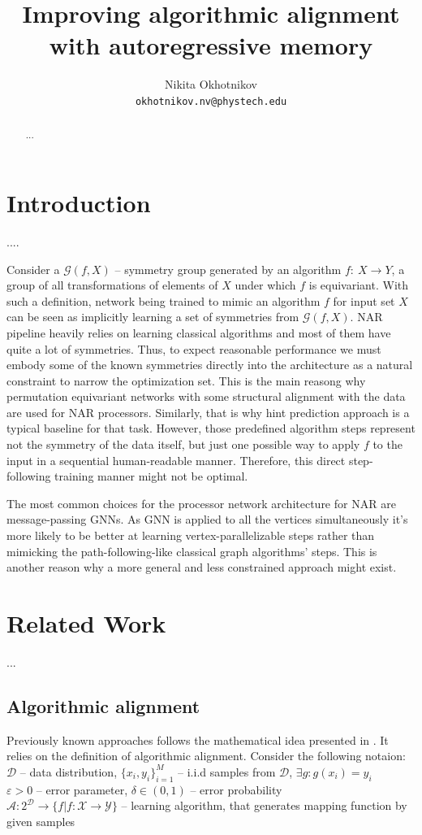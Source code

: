 \documentclass{article}
\title{Improving algorithmic alignment with autoregressive memory}
\author{Nikita Okhotnikov\\
	\texttt{okhotnikov.nv@phystech.edu} \\
}
\date{}
\begin{document}
\maketitle
\begin{abstract}
    ...
\end{abstract}

\section{Introduction}
    ....

     Consider a $\mathcal{G}(f, X)$ -- symmetry group generated
    by an algorithm $f:~ X\to Y$, a group of all transformations of elements of $X$ under which $f$ is equivariant. With such a definition, network being trained to 
    mimic an algorithm $f$ for input set $X$ can be seen as implicitly learning a set of symmetries from $\mathcal{G}(f, X)$. NAR \cite{velivckovic2021neural} 
    pipeline heavily relies on learning classical algorithms and most of them have quite a lot of symmetries. Thus, to expect reasonable performance we must embody 
    some of the known symmetries directly into the architecture as a natural constraint to narrow the optimization set. This is the main reasong why 
    permutation equivariant networks with some structural alignment with the data are used for NAR processors. 
    Similarly, that is why hint prediction approach is a typical baseline for that task. However, those predefined algorithm steps represent not the symmetry
    of the data itself, but just one possible way to apply $f$ to the input in a sequential human-readable manner. Therefore, this direct step-following 
    training manner might not be optimal. 

    The most common choices for the processor network architecture for NAR are message-passing GNNs. As GNN is applied to all the vertices simultaneously 
    it's more likely to be better at learning vertex-parallelizable steps rather than mimicking the path-following-like classical graph algorithms' steps. 
    This is another reason why a more general and less constrained approach might exist. 

\section{Related Work}
    ...
\subsection{Algorithmic alignment}
    Previously known approaches follows the mathematical idea presented in \cite{xu2019can}.
    It relies on the definition of algorithmic alignment. Consider the following notaion: \\
    $\mathcal{D}$ -- data distribution, $\{x_i, y_i\}_{i=1}^M$ -- i.i.d samples from $\mathcal{D}$, $\exists g: g(x_i) = y_i$\\ 
	$\varepsilon > 0$ -- error parameter, $\delta \in (0,1)$ -- error probability\\
	$\mathcal{A}: 2^\mathcal{D} \to \{f| f: \mathcal{X}\to \mathcal{Y}\}$ -- learning algorithm, that generates mapping function by given samples\\
\end{document}
